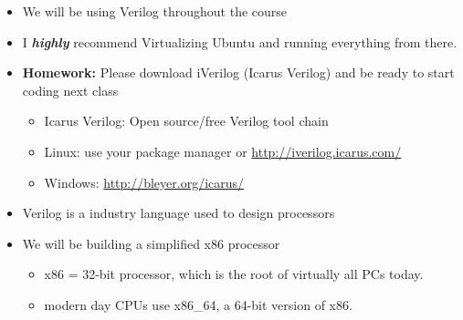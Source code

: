 \documentclass{beamer}
\begin{document}
\begin{frame}
\begin{itemize}
\item We will be using Verilog throughout the course
\item I \textbf{\textit{highly}} recommend Virtualizing Ubuntu and running everything from there.
\item \textbf{Homework:} Please download iVerilog (Icarus Verilog) and be ready to start coding next class
\begin{itemize}
\item Icarus Verilog: Open source/free Verilog tool chain
\item Linux: use your package manager or \url{http://iverilog.icarus.com/}
\item Windows: \url{http://bleyer.org/icarus/}
\end{itemize}
\item Verilog is a industry language used to design processors
\item We will be building a simplified x86 processor
\begin{itemize}
\item x86 = 32-bit processor, which is the root of virtually all PCs today.
\item modern day CPUs use x86\_64, a 64-bit version of x86.
\end{itemize}
\end{itemize}
\end{frame}
\end{document}
